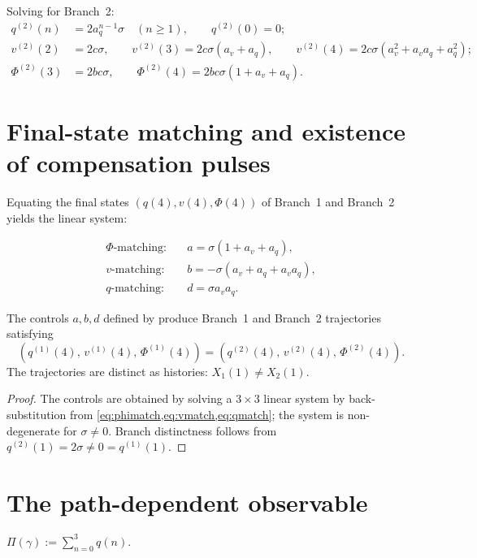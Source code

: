 \documentclass[12pt, oneside]{memoir}
\newcommand{\aq}{a_q}
\newcommand{\av}{a_v}
\begin{document}
Solving  for Branch~2:
\begin{align*}
  q^{(2)}(n) &= 2\aq^{n-1}\sigma \quad (n \ge 1), \qquad q^{(2)}(0) = 0; \\
  v^{(2)}(2) &= 2c\sigma, \qquad
  v^{(2)}(3) = 2c\sigma(\av + \aq), \qquad
  v^{(2)}(4) = 2c\sigma(\av^2 + \av\aq + \aq^2); \\
  \Phi^{(2)}(3) &= 2bc\sigma, \qquad
  \Phi^{(2)}(4) = 2bc\sigma(1 + \av + \aq).
\end{align*}

\section{Final-state matching and existence of compensation pulses}

Equating the final states $(q(4), v(4), \Phi(4))$ of Branch~1 and Branch~2 yields the
linear system:

\begin{align}
  \Phi\text{-matching:} \quad & a = \sigma(1 + \av + \aq), \label{eq:phimatch}\\
  v\text{-matching:}   \quad & b = -\sigma(\av + \aq + \av\aq), \label{eq:vmatch}\\
  q\text{-matching:}   \quad & d = \sigma\av\aq. \label{eq:qmatch}
\end{align}

\begin{theorem}
\label{thm:split}
The controls $a, b, d$ defined by  produce Branch~1
and Branch~2 trajectories satisfying
\[
  (q^{(1)}(4),\, v^{(1)}(4),\, \Phi^{(1)}(4))
  = (q^{(2)}(4),\, v^{(2)}(4),\, \Phi^{(2)}(4)).
\]
The trajectories are distinct as histories: $X_1(1) \ne X_2(1)$.
\end{theorem}

\begin{proof}
The controls are obtained by solving a $3\times 3$ linear system by back-substitution
from \cref{eq:phimatch,eq:vmatch,eq:qmatch}; the system is non-degenerate for
$\sigma \ne 0$.  Branch distinctness follows from $q^{(2)}(1) = 2\sigma \ne 0 = q^{(1)}(1)$.
\end{proof}

\section{The path-dependent observable}

\begin{definition}
\label{def:Pi}
$\Pi(\gamma) := \sum_{n=0}^{3} q(n)$.
\end{definition}
\end{document}
